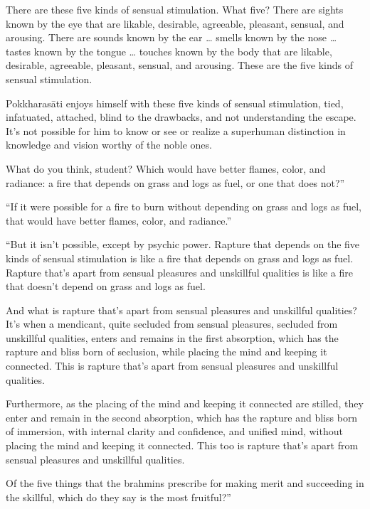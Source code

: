 \documentclass[12pt,openany]{book}%
\begin{document}
There are these five kinds of sensual stimulation. What five? There are sights known by the eye that are likable, desirable, agreeable, pleasant, sensual, and arousing. There are sounds known by the ear … smells known by the nose … tastes known by the tongue … touches known by the body that are likable, desirable, agreeable, pleasant, sensual, and arousing. These are the five kinds of sensual stimulation. 

\textsanskrit{Pokkharasāti} enjoys himself with these five kinds of sensual stimulation, tied, infatuated, attached, blind to the drawbacks, and not understanding the escape. It’s not possible for him to know or see or realize a superhuman distinction in knowledge and vision worthy of the noble ones. 

What do you think, student? Which would have better flames, color, and radiance: a fire that depends on grass and logs as fuel, or one that does not?” 

“If it were possible for a fire to burn without depending on grass and logs as fuel, that would have better flames, color, and radiance.” 

“But it isn’t possible, except by psychic power. Rapture that depends on the five kinds of sensual stimulation is like a fire that depends on grass and logs as fuel. Rapture that’s apart from sensual pleasures and unskillful qualities is like a fire that doesn’t depend on grass and logs as fuel. 

And what is rapture that’s apart from sensual pleasures and unskillful qualities? It’s when a mendicant, quite secluded from sensual pleasures, secluded from unskillful qualities, enters and remains in the first absorption, which has the rapture and bliss born of seclusion, while placing the mind and keeping it connected. This is rapture that’s apart from sensual pleasures and unskillful qualities. 

Furthermore, as the placing of the mind and keeping it connected are stilled, they enter and remain in the second absorption, which has the rapture and bliss born of immersion, with internal clarity and confidence, and unified mind, without placing the mind and keeping it connected. This too is rapture that’s apart from sensual pleasures and unskillful qualities. 

Of the five things that the brahmins prescribe for making merit and succeeding in the skillful, which do they say is the most fruitful?” 
\end{document}
